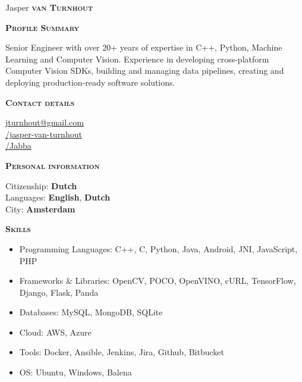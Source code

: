\documentclass[11pt, a4paper]{article}
\newcommand{\headleft}[1]{\vspace*{3ex}\textsc{\textbf{#1}}\par%
    \vspace*{-1.5ex}\hrulefill\par\vspace*{0.7ex}}
\begin{document}
\setlength{\topskip}{0pt}
\setlength{\parindent}{0pt}
\setlength{\parskip}{0pt}
\setlength{\fboxsep}{0pt}
\pagestyle{empty}
\raggedbottom

\begin{minipage}[t]{0.33\textwidth} %
\colorbox{cvblue1!80}{\begin{minipage}[t][5mm][t]{\textwidth}\null\hfill\null\end{minipage}}

\vspace{-.2ex} %
\colorbox{cvblue2}{\color{white}  %
\textwidth\relax%
\begin{minipage}[t][293mm][t]{0.82\textwidth}
\raggedright
\vspace*{2.5ex}

\Large Jasper \textbf{\textsc{van Turnhout}} \normalsize 

\vspace*{0.5ex} %

\headleft{Profile Summary}
Senior Engineer with over 20+ years of expertise in C++, Python, Machine Learning and Computer Vision. Experience in developing cross-platform Computer Vision SDKs, building and managing data pipelines, creating and deploying production-ready software solutions.

\headleft{Contact details}
\small %
 \href{mailto:jturnhout@gmail.com}{jturnhout@gmail.com}\\
 \href{https://linkedin.com/in/jasper-van-turnhout/}{/jasper-van-turnhout}\\
 \href{https://github.com/Jabba}{/Jabba}
\normalsize

\headleft{Personal information}
\small Citizenship: \textbf{Dutch} \\[0.5ex]
\small Languages: \textbf{English}, \textbf{Dutch} \\[0.5ex]
\small City: \textbf{Amsterdam}
\normalsize

\headleft{Skills}
\begin{itemize}
\item Programming Languages: C++, C, Python, Java, Android, JNI, JavaScript, PHP
\item Frameworks \& Libraries: OpenCV, POCO, OpenVINO, cURL, TensorFlow, Django, Flask, Panda
\item Databases: MySQL, MongoDB, SQLite
\item Cloud: AWS, Azure
\item Tools: Docker, Ansible, Jenkins, Jira, Github, Bitbucket
\item OS: Ubuntu, Windows, Balena
\end{itemize} 

\end{minipage}%
\textwidth\relax%
}
\end{minipage}%
\end{document}
